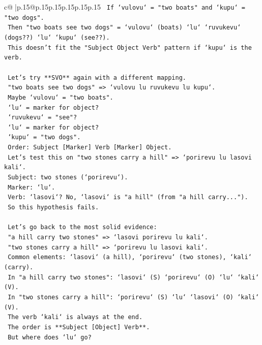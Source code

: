 \documentclass{article}
\begin{document}
{\begin{supertabular}{c@{$\;$}|p{.15\linewidth}@{}p{.15\linewidth}p{.15\linewidth}p{.15\linewidth}p{.15\linewidth}p{.15\linewidth}}
{{{\texttt{   If `vulovu` = "two boats" and `kupu` = "two dogs".} \\
\texttt{   Then "two boats see two dogs" = `vulovu` (boats) `lu` `ruvukevu` (dogs??) `lu` `kupu` (see??).} \\
\texttt{   This doesn't fit the "Subject Object Verb" pattern if `kupu` is the verb.} \\
\\ 
\texttt{   Let's try **SVO** again with a different mapping.} \\
\texttt{   "two boats see two dogs" => `vulovu lu ruvukevu lu kupu`.} \\
\texttt{   Maybe `vulovu` = "two boats".} \\
\texttt{   `lu` = marker for object?} \\
\texttt{   `ruvukevu` = "see"?} \\
\texttt{   `lu` = marker for object?} \\
\texttt{   `kupu` = "two dogs".} \\
\texttt{   Order: Subject {[}Marker{]} Verb {[}Marker{]} Object.} \\
\texttt{   Let's test this on "two stones carry a hill" => `porirevu lu lasovi kali`.} \\
\texttt{   Subject: two stones (`porirevu`).} \\
\texttt{   Marker: `lu`.} \\
\texttt{   Verb: `lasovi`? No, `lasovi` is "a hill" (from "a hill carry...").} \\
\texttt{   So this hypothesis fails.} \\
\\ 
\texttt{   Let's go back to the most solid evidence:} \\
\texttt{   "a hill carry two stones" => `lasovi porirevu lu kali`.} \\
\texttt{   "two stones carry a hill" => `porirevu lu lasovi kali`.} \\
\texttt{   Common elements: `lasovi` (a hill), `porirevu` (two stones), `kali` (carry).} \\
\texttt{   In "a hill carry two stones": `lasovi` (S) `porirevu` (O) `lu` `kali` (V).} \\
\texttt{   In "two stones carry a hill": `porirevu` (S) `lu` `lasovi` (O) `kali` (V).} \\
\texttt{   The verb `kali` is always at the end.} \\
\texttt{   The order is **Subject {[}Object{]} Verb**.} \\
\texttt{   But where does `lu` go?} \\
}}}
\end{supertabular}}
\end{document}
